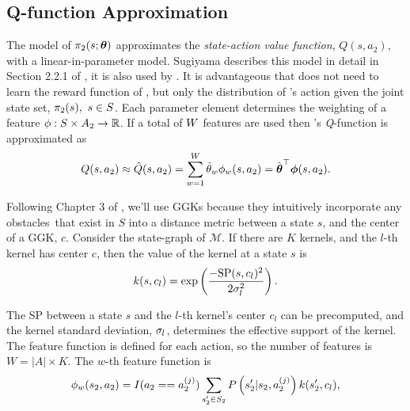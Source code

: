 \subsection{Q-function Approximation}\label{sec:policy_parameterization}
    The model of $\pi_{2}(s; \boldsymbol{\mathbb{\theta}})$ approximates the \textit{state-action value function}, $Q(s,a_2)$, with a
    linear-in-parameter model. Sugiyama describes this model in detail in Section 2.2.1 of
    \cite{Sugiyama2015StatisticalRL}, it is also used by \cite{Hanawal2017LearningPolicies}. It is advantageous that
     does not need to learn the reward function of , but only the distribution of 's action
    given the joint state set, $\pi_{2}(s),\ s\in S$. Each parameter element determines the weighting of a feature
    $\phi : S \times A_2 \rightarrow \mathbb{R}$. If a total of $W$ features are used then 's
    \textit{Q}-function is approximated as
    \begin{equation*}\label{eq:QFuncApprox}
    Q(s,a_2) \approx \hat{Q}(s,a_2)
    = \sum_{w=1}^{W} \hat{\theta}_{w} \phi_{w}(s,a_2)
    = \hat{\boldsymbol{\mathbb{\theta}}}^\top \boldsymbol{\mathbb{\phi}}(s, a_2).
    \end{equation*}

    Following Chapter 3 of \cite{Sugiyama2015StatisticalRL}, we'll use \acp{GGK} because they intuitively incorporate
    any obstacles\footnotemark\ that exist in $S$ into a distance metric between a state $s$, and the center of a
    \ac{GGK}, $c$. Consider the state-graph of $\mathcal{M}$. If there are $K$ kernels, and the $l$-th kernel has center
    $c$, then the value of the kernel at a state $s$ is
    \begin{equation*}
        k(s,c_{l}) = \exp \left( \frac{-\text{SP}(s,c_{l})^2}
                                                             {2\sigma^2_{l}} \right).
    \end{equation*}


    \noindent
    The \ac{SP} between a state $s$ and the $l$-th kernel's center $c_l$ can be precomputed, and the kernel standard
    deviation, $\sigma_{l}$, determines the effective support of the kernel. The feature function is defined
    for each action, so the number of features is $W = |A| \times K$. The $w$-th feature function is
    \begin{equation}\label{eq:kernel_func}
        \phi_{w}(s_2,a_2) = I(a_2==a_2^{(j)})\sum_{s_2'\in S_2}P\left(s_2'|s_2,a_2^{(j)}\right)
                                k(s_2',c_{l}),
    \end{equation}

